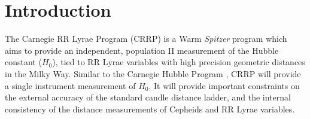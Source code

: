 \documentclass[a4paper,fleqn,usenatbib]{mnras}
\begin{document}


\section{Introduction}
\label{sec:intro}

%
%

The Carnegie RR Lyrae Program (CRRP) is a Warm {\it Spitzer} program \citep[][PID 90002]{2012sptz.prop90002F} which aims to provide an independent, population II measurement of the Hubble constant ($H_{0}$), tied to RR Lyrae variables with high precision geometric distances in the Milky Way. Similar to the Carnegie Hubble Program \citep[CHP][]{2011AJ....142..192F}, CRRP will provide a single instrument measurement of $H_{0}$. It will provide important constraints on the external accuracy of the standard candle distance ladder, and the internal consistency of the distance measurements of Cepheids and RR Lyrae variables.
\end{document}
